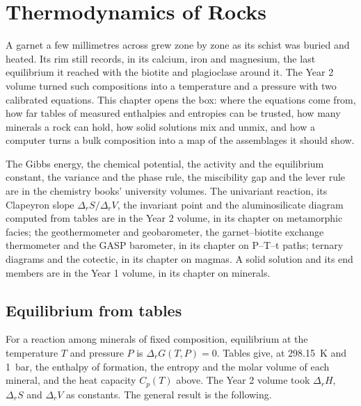 \chapter{Thermodynamics of Rocks}\label{ch:b3:petrological-thermodynamics}

A garnet a few millimetres across grew zone by zone as its schist was buried
and heated. Its rim still records, in its calcium, iron and magnesium, the
last equilibrium it reached with the biotite and plagioclase around it. The
Year 2 volume turned such compositions into a temperature and a pressure with
two calibrated equations. This chapter opens the box: where the equations
come from, how far tables of measured enthalpies and entropies can be
trusted, how many minerals a rock can hold, how solid solutions mix and
unmix, and how a computer turns a bulk composition into a map of the
assemblages it should show.

\begin{recall}
The Gibbs energy, the chemical potential, the activity and the equilibrium
constant, the variance and the phase rule, the miscibility gap and the lever
rule are in the chemistry books' university volumes. The univariant reaction,
its Clapeyron slope $\Delta_rS/\Delta_rV$, the invariant point and the
aluminosilicate diagram computed from tables are in the Year 2 volume, in its
chapter on metamorphic facies; the geothermometer and geobarometer, the
garnet--biotite exchange thermometer and the GASP barometer, in its chapter on
P--T--t paths; ternary diagrams and the cotectic, in its chapter on magmas. A
solid solution and its end members are in the Year 1 volume, in its chapter on
minerals.
\end{recall}

\section{Equilibrium from tables}\label{sec:b3:petrological-thermodynamics:tables}

For a reaction among minerals of fixed composition, equilibrium at the
temperature $T$ and pressure $P$ is $\Delta_rG(T, P) = 0$. Tables give, at
\qty{298.15}{K} and \qty{1}{bar}, the enthalpy of formation, the entropy and
the molar volume of each mineral, and the heat capacity $C_p(T)$ above. The
Year 2 volume took $\Delta_rH$, $\Delta_rS$ and $\Delta_rV$ as constants. The
general result is the following.

